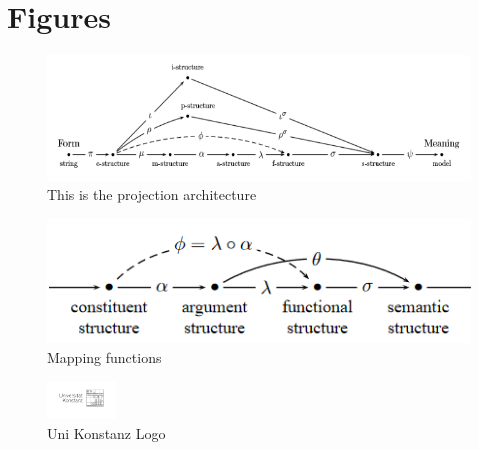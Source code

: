 \chapter{Figures}
\label{ch:figures}



\begin{figure}[!h]  
    \centering
    \includegraphics[scale=0.5]{./tex/figures/parallelprojection.png}
    \caption{This is the projection architecture}
    \label{fig-label1}
\end{figure}

\begin{figure}[!b]  
    \centering
    \includegraphics[width=.9\textwidth]{./tex/figures/mapping-functions.png}
    \caption{Mapping functions}
    \label{fig-label1}
\end{figure}

\begin{figure}[!t]  
    \centering
    \includegraphics[height=1cm]{./tex/figures/UniKonstanz-Logo-Optimum-sRGB.jpg}
    \caption{Uni Konstanz Logo}
    \label{fig-label1}
\end{figure}